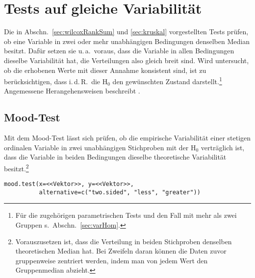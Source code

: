 \section{Tests auf gleiche Variabilität}
\label{sec:dispHom}

Die in Abschn.\ \ref{sec:wilcoxRankSum} und \ref{sec:kruskal} vorgestellten Tests prüfen, ob eine Variable in zwei oder mehr unabhängigen Bedingungen denselben Median besitzt. Dafür setzen sie u.\,a.\ voraus, dass die Variable in allen Bedingungen dieselbe Variabilität hat, die Verteilungen also gleich breit sind. Wird untersucht, ob die erhobenen Werte mit dieser Annahme konsistent sind, ist zu berücksichtigen, dass i.\,d.\,R.\ die $\text{H}_{0}$ den gewünschten Zustand darstellt.\footnote{Für die zugehörigen parametrischen Tests und den Fall mit mehr als zwei Gruppen s.\ Abschn.\ \ref{sec:varHom}.} Angemessene Herangehensweisen beschreibt .

\subsection{Mood-Test}
\label{sec:mood}

Mit dem Mood-Test lässt sich prüfen, ob die empirische Variabilität einer stetigen ordinalen Variable in zwei unabhängigen Stichproben mit der $\text{H}_{0}$ verträglich ist, dass die Variable in beiden Bedingungen dieselbe theoretische Variabilität besitzt.\footnote{\label{ftn:mood}Vorauszusetzen ist, dass die Verteilung in beiden Stichproben denselben theoretischen Median hat. Bei Zweifeln daran können die Daten zuvor gruppenweise zentriert werden, indem man von jedem Wert den Gruppenmedian abzieht.}
\begin{lstlisting}
mood.test(x=<<Vektor>>, y=<<Vektor>>,
          alternative=c("two.sided", "less", "greater"))
\end{lstlisting}

